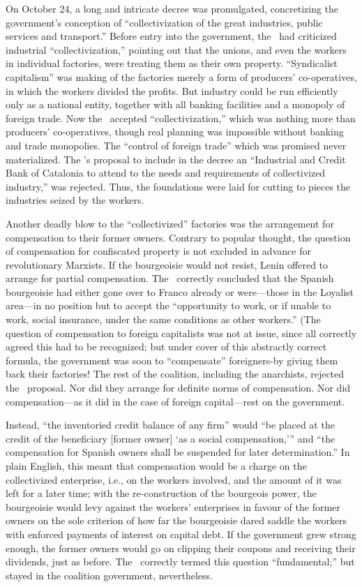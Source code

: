 On October 24, a long and intricate decree was promulgated, concretizing the government’s conception of ``collectivization of the great industries, public services and transport.'' Before entry into the government, the \POUM\ had criticized industrial ``collectivization,'' pointing out that the unions, and even the workers in individual factories, were treating them as their own property. ``Syndicalist capitalism'' was making of the factories merely a form of producers’ co-operatives, in which the workers divided the profits. But industry could be run efficiently only as a national entity, together with all banking facilities and a monopoly of foreign trade. Now the \POUM\ accepted ``collectivization,'' which was nothing more than producers’ co-operatives, though real planning was impossible without banking and trade monopolies. The ``control of foreign trade'' which was promised never materialized. The \POUM’s proposal to include in the decree an ``Industrial and Credit Bank of Catalonia to attend to the needs and requirements of collectivized industry,'' was rejected. Thus, the foundations were laid for cutting to pieces the industries seized by the workers.

Another deadly blow to the ``collectivized'' factories was the arrangement for compensation to their former owners. Contrary to popular thought, the question of compensation for confiscated property is not excluded in advance for revolutionary Marxists. If the bourgeoisie would not resist, Lenin offered to arrange for partial compensation. The \POUM\ correctly concluded that the Spanish bourgeoisie had either gone over to Franco already or were---those in the Loyalist area---in no position but to accept the ``opportunity to work, or if unable to work, social insurance, under the same conditions as other workers.'' (The question of compensation to foreign capitalists was not at issue, since all correctly agreed this had to be recognized; but under cover of this abstractly correct formula, the government was soon to ``compensate'' foreigners-by giving them back their factories! The rest of the coalition, including the anarchists, rejected the \POUM\ proposal. Nor did they arrange for definite norms of compensation. Nor did compensation---as it did in the case of foreign capital---rest on the government.

Instead, ``the inventoried credit balance of any firm'' would ``be placed at the credit of the beneficiary [former owner] `as a social compensation,''' and ``the compensation for Spanish owners shall be suspended for later determination.'' In plain English, this meant that compensation would be a charge on the collectivized enterprise, i.e., on the workers involved, and the amount of it was left for a later time; with the re-construction of the bourgeois power, the bourgeoisie would levy against the workers’ enterprises in favour of the former owners on the sole criterion of how far the bourgeoisie dared saddle the workers with enforced payments of interest on capital debt. If the government grew strong enough, the former owners would go on clipping their coupons and receiving their dividends, just as before. The \POUM\ correctly termed this question ``fundamental;'' but stayed in the coalition government, nevertheless.

